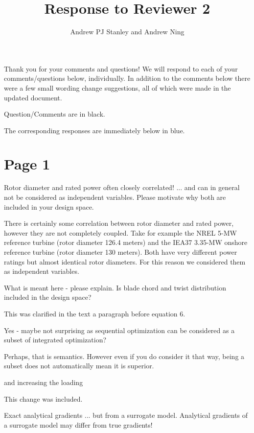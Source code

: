 \documentclass[12pt]{report}
\title{Response to Reviewer 2}
\begin{document}
\author{Andrew PJ Stanley and Andrew Ning}

\maketitle

Thank you for your comments and questions! We will respond to each of your comments/questions below, individually. In addition to the comments below there were a few small wording change suggestions, all of which were made in the updated document.

\bigskip
Question/Comments are in black.

\color{blue} The corresponding responses are immediately below in blue.

\color{black}
\section*{Page 1}
Rotor diameter and rated power often closely correlated! ... and can in general not be considered as independent variables. Please motivate why both are included in your design space.

\color{blue} There is certainly some correlation between rotor diameter and rated power, however they are not completely coupled. Take for example the NREL 5-MW reference turbine (rotor diameter 126.4 meters) and the IEA37 3.35-MW onshore reference turbine (rotor diameter 130 meters). Both have very different power ratings but almost identical rotor diameters. For this reason we considered them as independent variables.

\bigskip \color{black}
What is meant here - please explain. Is blade chord and twist distribution included in the design space?

\color{blue} This was clarified in the text a paragraph before equation 6.

\bigskip \color{black}
Yes - maybe not surprising as sequential optimization can be considered as a subset of integrated optimization?

\color{blue} Perhaps, that is semantics. However even if you do consider it that way, being a subset does not automatically mean it is superior.

\bigskip \color{black}
and increasing the loading

\color{blue} This change was included.

\bigskip \color{black}
Exact analytical gradients ... but from a surrogate model. Analytical gradients  of a surrogate model may differ from true gradients!
\end{document}
